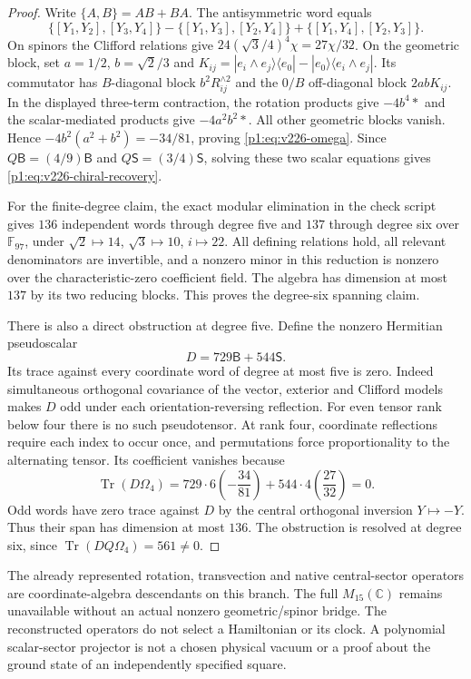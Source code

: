 \documentclass[11pt]{article}
\begin{document}
\begin{proof}
Write $\{A,B\}=AB+BA$. The antisymmetric word equals
\[
 \{[Y_1,Y_2],[Y_3,Y_4]\}
 -\{[Y_1,Y_3],[Y_2,Y_4]\}
 +\{[Y_1,Y_4],[Y_2,Y_3]\}.
\]
On spinors the Clifford relations give
$24(\sqrt3/4)^4\chi=27\chi/32$. On the geometric block, set
$a=1/2$, $b=\sqrt2/3$ and
$K_{ij}=|e_i\wedge e_j\rangle\langle e_0|
        -|e_0\rangle\langle e_i\wedge e_j|$.
Its commutator has $B$-diagonal block $b^2R_{ij}^{\wedge2}$ and the
$0/B$ off-diagonal block $2abK_{ij}$. In the displayed three-term
contraction, the rotation products give $-4b^4*$ and the scalar-mediated
products give $-4a^2b^2*$. All other geometric blocks vanish. Hence
$-4b^2(a^2+b^2)=-34/81$, proving \eqref{p1:eq:v226-omega}.
Since $Q\mathsf B=(4/9)\mathsf B$ and
$Q\mathsf S=(3/4)\mathsf S$, solving these two scalar equations gives
\eqref{p1:eq:v226-chiral-recovery}.

For the finite-degree claim, the exact modular elimination in the check
script gives $136$ independent words through degree five and $137$ through
degree six over $\mathbb{F}_{97}$, under
$\sqrt2\mapsto14$, $\sqrt3\mapsto10$, $i\mapsto22$.
All defining relations hold, all relevant denominators are invertible,
and a nonzero minor in this reduction is nonzero over the characteristic-zero
coefficient field. The algebra has dimension at most $137$ by its two
reducing blocks. This proves the degree-six spanning claim.

There is also a direct obstruction at degree five. Define the nonzero
Hermitian pseudoscalar
\[
 D=729\mathsf B+544\mathsf S.
\]
Its trace against every coordinate word of degree at most five is zero.
Indeed simultaneous orthogonal covariance of the vector, exterior and
Clifford models makes $D$ odd under each orientation-reversing reflection.
For even tensor rank below four there is no such pseudotensor. At rank
four, coordinate reflections require each index to occur once, and
permutations force proportionality to the alternating tensor. Its coefficient
vanishes because
\[
 \operatorname{Tr}(D\Omega_4)
 =729\cdot6\left(-\frac{34}{81}\right)
  +544\cdot4\left(\frac{27}{32}\right)=0.
\]
Odd words have zero trace against $D$ by the central orthogonal inversion
$Y\mapsto-Y$. Thus their span has dimension at most $136$. The obstruction
is resolved at degree six, since
$\operatorname{Tr}(DQ\Omega_4)=561\ne0$.
\end{proof}

\begin{corollary}
\label{p1a:corollary:atlas-exact-scope-of-the-reconstruction-001f1a9}%

The already represented rotation, transvection and native central-sector
operators are coordinate-algebra descendants on this branch. The full
$M_{15}(\mathbb{C})$ remains unavailable without an actual nonzero geometric/spinor
bridge. The reconstructed operators do not select a Hamiltonian or its
clock. A polynomial scalar-sector projector is not a chosen physical
vacuum or a proof about the ground state of an independently specified square.
\end{corollary}
\end{document}
